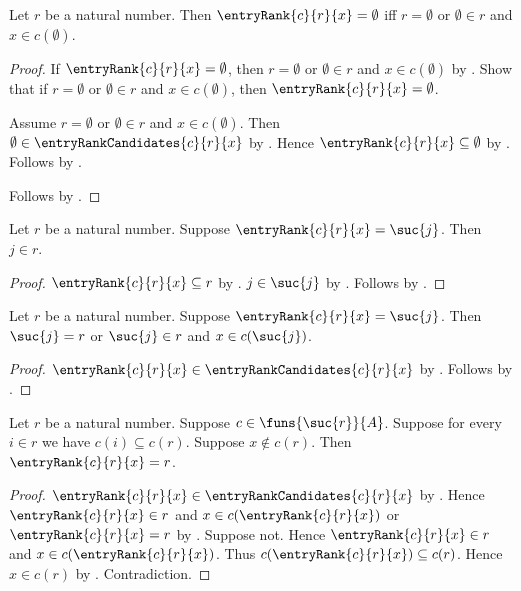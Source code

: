 \begin{proposition}\label{entry_rank_eq_zero_iff}
    Let $r$ be a natural number.
    Then $\entryRank{c}{r}{x}=\emptyset$ iff
        $r=\emptyset$ or $\emptyset\in r$ and $x\in c(\emptyset)$.
\end{proposition}
\begin{proof}
    If $\entryRank{c}{r}{x}=\emptyset$, then
        $r=\emptyset$ or $\emptyset\in r$ and $x\in c(\emptyset)$
        by .
    Show that if $r=\emptyset$ or
        $\emptyset\in r$ and $x\in c(\emptyset)$, then
        $\entryRank{c}{r}{x}=\emptyset$.
    \begin{subproof}
        Assume $r=\emptyset$ or
            $\emptyset\in r$ and $x\in c(\emptyset)$.
        Then $\emptyset\in\entryRankCandidates{c}{r}{x}$
            by .
        Hence $\entryRank{c}{r}{x}\subseteq\emptyset$
            by .
        Follows by .
    \end{subproof}
    Follows by \auto.
\end{proof}

\begin{proposition}\label{entry_rank_successor_predecessor}
    Let $r$ be a natural number.
    Suppose $\entryRank{c}{r}{x}=\suc{j}$.
    Then $j\in r$.
\end{proposition}
\begin{proof}
    $\entryRank{c}{r}{x}\subseteq r$
        by .
    $j\in\suc{j}$ by .
    Follows by .
\end{proof}

\begin{proposition}\label{entry_rank_successor_candidate}
    Let $r$ be a natural number.
    Suppose $\entryRank{c}{r}{x}=\suc{j}$.
    Then $\suc{j}=r$ or
        $\suc{j}\in r$ and $x\in c(\suc{j})$.
\end{proposition}
\begin{proof}
    $\entryRank{c}{r}{x}\in\entryRankCandidates{c}{r}{x}$
        by .
    Follows by .
\end{proof}

\begin{proposition}\label{entry_rank_eq_sentinel_outside_last}
    Let $r$ be a natural number.
    Suppose $c\in\funs{\suc{r}}{A}$.
    Suppose for every $i\in r$ we have $c(i)\subseteq c(r)$.
    Suppose $x\notin c(r)$.
    Then $\entryRank{c}{r}{x}=r$.
\end{proposition}
\begin{proof}
    $\entryRank{c}{r}{x}\in\entryRankCandidates{c}{r}{x}$
        by .
    Hence $\entryRank{c}{r}{x}\in r$ and
        $x\in c(\entryRank{c}{r}{x})$ or
        $\entryRank{c}{r}{x}=r$
        by .
    Suppose not.
    Hence $\entryRank{c}{r}{x}\in r$ and
        $x\in c(\entryRank{c}{r}{x})$.
    Thus $c(\entryRank{c}{r}{x})\subseteq c(r)$.
    Hence $x\in c(r)$ by .
    Contradiction.
\end{proof}

